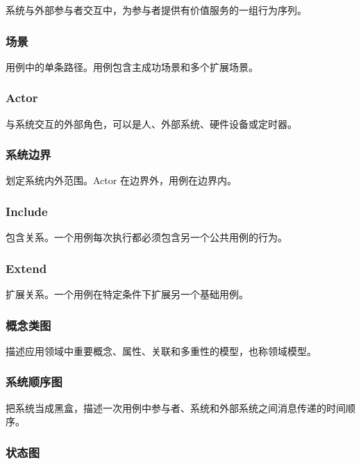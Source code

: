\documentclass[UTF8,zihao=-4]{ctexart}
\begin{document}
系统与外部参与者交互中，为参与者提供有价值服务的一组行为序列。


\subsubsection*{场景}


用例中的单条路径。用例包含主成功场景和多个扩展场景。


\subsubsection*{Actor}


与系统交互的外部角色，可以是人、外部系统、硬件设备或定时器。


\subsubsection*{系统边界}


划定系统内外范围。Actor 在边界外，用例在边界内。


\subsubsection*{Include}


包含关系。一个用例每次执行都必须包含另一个公共用例的行为。


\subsubsection*{Extend}


扩展关系。一个用例在特定条件下扩展另一个基础用例。


\subsubsection*{概念类图}


描述应用领域中重要概念、属性、关联和多重性的模型，也称领域模型。


\subsubsection*{系统顺序图}


把系统当成黑盒，描述一次用例中参与者、系统和外部系统之间消息传递的时间顺序。


\subsubsection*{状态图}
\end{document}
